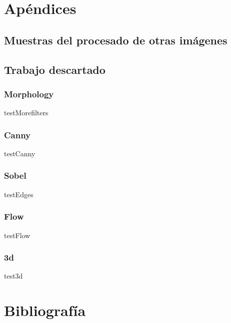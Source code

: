 \documentclass[a4paper,12pt]{article}
\begin{document}
\label{sec:Problemas}


\appendix
\section{Apéndices}
\subsection{Muestras del procesado de otras imágenes}
\subsection{Trabajo descartado}
\subsubsection{Morphology}
\label{sec:morf}
testMorefilters
\subsubsection{Canny}
testCanny
\subsubsection{Sobel}
testEdges
\subsubsection{Flow}
testFlow
\subsubsection{3d}
test3d
\section{Bibliografía}



\clearpage
\end{document}
